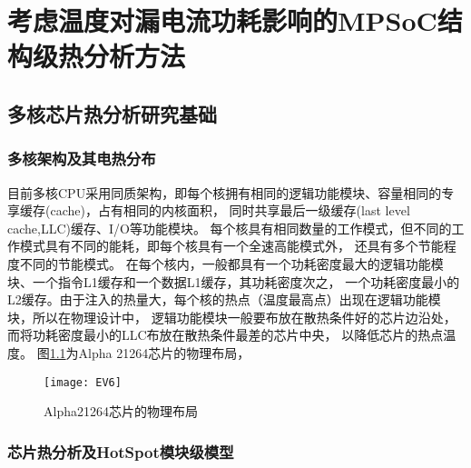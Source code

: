 

\chapter{考虑温度对漏电流功耗影响的MPSoC结构级热分析方法}
\label{cha:SSTA}


\section{多核芯片热分析研究基础}
\label{sec:SSTAbasic}

\subsection{多核架构及其电热分布}

目前多核CPU采用同质架构，即每个核拥有相同的逻辑功能模块、容量相同的专享缓存(cache)，占有相同的内核面积， 同时共享最后一级缓存(last level cache,LLC)缓存、I/O等功能模块。 每个核具有相同数量的工作模式，但不同的工作模式具有不同的能耗，即每个核具有一个全速高能模式外， 还具有多个节能程度不同的节能模式。
在每个核内，一般都具有一个功耗密度最大的逻辑功能模块、一个指令L1缓存和一个数据L1缓存，其功耗密度次之， 一个功耗密度最小的L2缓存。由于注入的热量大，每个核的热点（温度最高点）出现在逻辑功能模块，所以在物理设计中， 逻辑功能模块一般要布放在散热条件好的芯片边沿处，而将功耗密度最小的LLC布放在散热条件最差的芯片中央， 以降低芯片的热点温度。 图\ref{fig:ev6}为Alpha 21264芯片的物理布局，

\begin{figure}[H]
  \centering
  \texttt{[image: EV6]}
  \caption{Alpha21264芯片的物理布局}
  \label{fig:ev6}
\end{figure}


\subsection{芯片热分析及HotSpot模块级模型}

